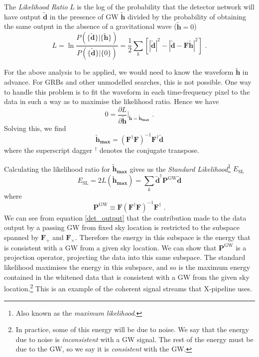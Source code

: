 \documentclass[11pt]{cuthesis}
\newcommand{\fs}{\text{ .}}
\newcommand{\tbd}{\tilde{\textbf{d}}}
\newcommand{\tbh}{\tilde{\textbf{h}}}
\newcommand{\xp}{X-pipeline }
\begin{document}
The \emph{Likelihood Ratio} $L$ is the log of the probability that the detector network will have output $ \tilde{\textbf{d}}$ in the presence of GW $\tbh$  divided by the probability of obtaining the same output in the absence of a gravitational wave ($\tbh=0$)
\begin{equation}
L=\ln \frac{P(\{ \tilde{\textbf{d}} \}|\{ \tilde{\textbf{h}} \})}{P(\{ \tilde{\textbf{d}} \}|\{ 0  \})}= \frac{1}{2} \sum_k \left[ \left| \tbd  \right|^2 - \left| \tbd - \textbf{F} \tbh   \right|^2  \right] \fs
\end{equation}

For the above analysis to be applied, we would need to know the waveform $\tbh$ in advance. For GRBs and other unmodelled searches, this is not possible. One way to handle this problem is to fit the waveform in each time-frequency pixel to the data in such a way as to maximise the likelihood ratio. Hence we have
\begin{equation}
0=\frac{\partial L}{\partial \tbh} \bigg|_{\tbh=\tbh_{\textbf{max}}} \fs
\end{equation} 
Solving this, we find
\begin{equation} 
\tbh_\textbf{max}=(\textbf{F}^\dagger \textbf{F} )^{-1} \textbf{F}^\dagger \tbd
\end{equation}
where the superscript dagger $^\dagger$ denotes the conjugate transpose. 

Calculating the likelihood ratio for $\tbh_\textbf{max}$ gives us the \emph{Standard Likelihood}\footnote{Also known as the \textit{maximum likelihood}.} $E_\text{SL}$
\begin{equation} \label{Esl}
E_\text{SL}=2L(\tbh_\textbf{max} )=\sum_k \tbd^\dagger \textbf{P}^\text{GW} \tbd
\end{equation}
where 
\begin{equation} \label{projOp1}
\textbf{P}^\text{GW} \equiv \textbf{F} (\textbf{F}^\dagger \textbf{F})^{-1} \textbf{F}^\dagger \fs
\end{equation}
We can see from equation \ref{det_output} that the contribution made to the data output by a passing GW from fixed sky location is restricted to the subspace spanned by $\textbf{F}_+$ and $\textbf{F}_\times$. Therefore the energy in this subspace is the energy that is consistent with a GW from a given sky location. We can show that $\textbf{P}^\text{GW} $ is a projection operator, projecting the data into this same subspace. The standard likelihood maximises the energy in this subspace, and so is the maximum energy contained in the whitened data that is consistent with a GW from the given sky location.\footnote{In practice, some of this energy will be due to noise. We say that the energy due to noise is \emph{inconsistent} with a GW signal. The rest of the energy must be due to the GW, so we say it is \emph{consistent} with the GW.} This is an example of the coherent signal streams that \xp uses.
\end{document}
